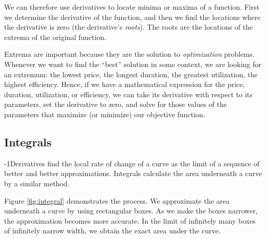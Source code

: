 We can therefore use derivatives to locate minima or maxima of a
function. First we determine the derivative of the function, and then
we find the locations where the derivative is zero (the derivative's
\emph{roots}). The roots are the locations of the extrema of the
original function.

Extrema  are important because they are the solution to
\emph{optimization} problems.  Whenever we want to find the ``best''
solution in some context, we are looking for an extremum: the lowest
price, the longest duration, the greatest utilization, the highest
efficiency. Hence, if we have a mathematical expression for the price,
duration, utilization, or efficiency, we can take its derivative with
respect to its parameters, set the derivative to zero, and solve for
those values of the parameters that maximize (or minimize) our
objective function.\vspace*{-6pt}

    
\subsection{Integrals}


\looseness-1Derivatives find the local rate of change of a curve as the limit of a
sequence of better and better approximations. Integrals calculate the
area underneath a curve by a similar method.

Figure \ref{fig:integral} demonstrates the process. We approximate the
area underneath a curve by using rectangular boxes. As we make the
boxes narrower, the approximation becomes more accurate.  In the limit
of infinitely many boxes of infinitely narrow width, we obtain the exact
area under the curve.

